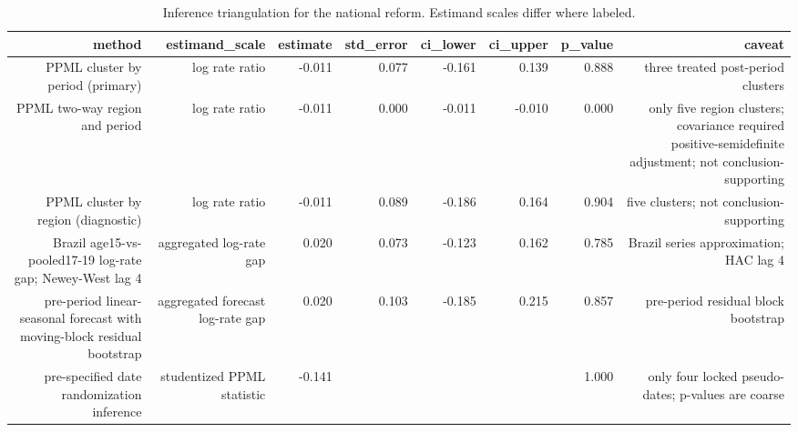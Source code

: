 \begin{table}[!htbp]
\centering
\caption{Inference triangulation for the national reform. Estimand scales differ where labeled.} 
\label{tab:inference}
\begingroup\small
\begin{tabular}{rrrrrrrr}
  \hline
method & estimand\_scale & estimate & std\_error & ci\_lower & ci\_upper & p\_value & caveat \\ 
  \hline
PPML cluster by period (primary) & log rate ratio & -0.011 & 0.077 & -0.161 & 0.139 & 0.888 & three treated post-period clusters \\ 
  PPML two-way region and period & log rate ratio & -0.011 & 0.000 & -0.011 & -0.010 & 0.000 & only five region clusters; covariance required positive-semidefinite adjustment; not conclusion-supporting \\ 
  PPML cluster by region (diagnostic) & log rate ratio & -0.011 & 0.089 & -0.186 & 0.164 & 0.904 & five clusters; not conclusion-supporting \\ 
  Brazil age15-vs-pooled17-19 log-rate gap; Newey-West lag 4 & aggregated log-rate gap & 0.020 & 0.073 & -0.123 & 0.162 & 0.785 & Brazil series approximation; HAC lag 4 \\ 
  pre-period linear-seasonal forecast with moving-block residual bootstrap & aggregated forecast log-rate gap & 0.020 & 0.103 & -0.185 & 0.215 & 0.857 & pre-period residual block bootstrap \\ 
  pre-specified date randomization inference & studentized PPML statistic & -0.141 &  &  &  & 1.000 & only four locked pseudo-dates; p-values are coarse \\ 
   \hline
\end{tabular}
\endgroup
\end{table}
